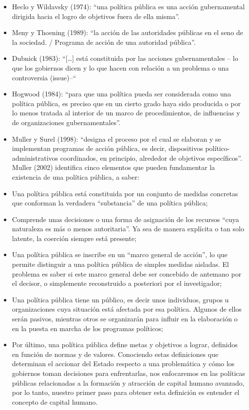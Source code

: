 \documentclass{article}
\begin{document}
\begin{itemize}
\item Heclo y Wildavsky (1974): “una política pública es una acción gubernamental dirigida
hacia el logro de objetivos fuera de ella misma”.
\item Meny y Thoening (1989): “la acción de las autoridades públicas en el seno de la
sociedad. / Programa de acción de una autoridad pública”.
\item Dubnick (1983): “[…] está constituida por las acciones gubernamentales – lo que los
gobiernos dicen y lo que hacen con relación a un problema o una controversia (issue)–“
\item Hogwood (1984): “para que una política pueda ser considerada como una política
pública, es preciso que en un cierto grado haya sido producida o por lo menos tratada al
interior de un marco de procedimientos, de influencias y de organizaciones
gubernamentales”.
\item Muller y Surel (1998): “designa el proceso por el cual se elaboran y se implementan
programas de acción pública, es decir, dispositivos político-administrativos coordinados,
en principio, alrededor de objetivos específicos”.
Muller (2002) identifica cinco elementos que pueden fundamentar la existencia de una política
pública, a saber:
\item Una política pública está constituida por un conjunto de medidas concretas que
conforman la verdadera “substancia” de una política pública;
\item Comprende unas decisiones o una forma de asignación de los recursos “cuya
naturaleza es más o menos autoritaria”. Ya sea de manera explícita o tan solo latente, la
coerción siempre está presente;
\item Una política pública se inscribe en un “marco general de acción”, lo que permite
distinguir a una política pública de simples medidas aisladas. El problema es saber si
este marco general debe ser concebido de antemano por el decisor, o simplemente
reconstruido a posteriori por el investigador;
\item Una política pública tiene un público, es decir unos individuos, grupos u organizaciones
cuya situación está afectada por esa política. Algunos de ellos serán pasivos, mientras
otros se organizarán para influir en la elaboración o en la puesta en marcha de los
programas políticos;
\item Por último, una política pública define metas y objetivos a lograr, definidos en función de
normas y de valores.
Conociendo estas definiciones que determinan el accionar del Estado respecto a una
problemática y cómo los gobiernos toman decisiones para enfrentarlas, nos enfocaremos en las
políticas públicas relacionadas a la formación y atracción de capital humano avanzado, por lo
tanto, nuestro primer paso para obtener esta definición es entender el concepto de capital
humano.
\end{itemize}
\end{document}
